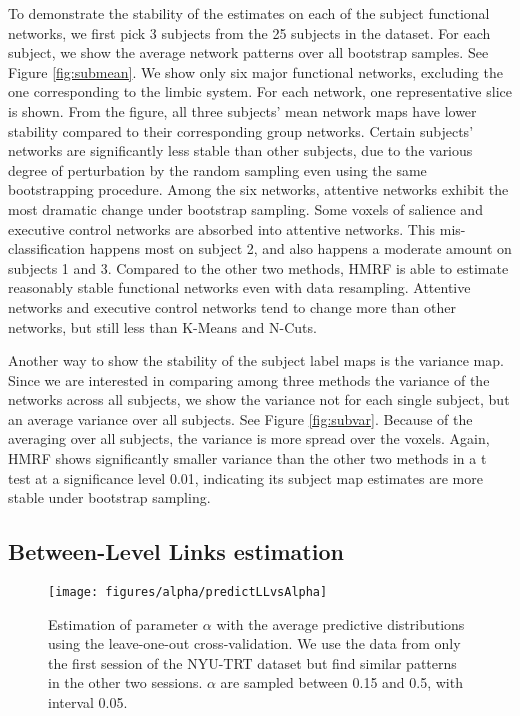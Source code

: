 \documentclass[review,authoryear]{elsarticle}
\begin{document}
To demonstrate the stability of the estimates on each of the subject functional
networks, we first pick 3 subjects from the 25 subjects in the dataset. For each
subject, we show the average network patterns over all bootstrap samples. See
Figure \ref{fig:submean}. We show only six major functional networks, excluding
the one corresponding to the limbic system. For each network, one representative
slice is shown. From the figure, all three subjects' mean network maps have
lower stability compared to their corresponding group networks. Certain
subjects' networks are significantly less stable than other subjects, due to the
various degree of perturbation by the random sampling even using the same
bootstrapping procedure. Among the six networks, attentive networks exhibit the
most dramatic change under bootstrap sampling. Some voxels of salience and
executive control networks are absorbed into attentive networks. This
mis-classification happens most on subject 2, and also happens a moderate amount
on subjects 1 and 3. Compared to the other two methods, HMRF is able to estimate
reasonably stable functional networks even with data resampling. Attentive
networks and executive control networks tend to change more than other networks,
but still less than K-Means and N-Cuts.

Another way to show the stability of the subject label maps is the variance
map. Since we are interested in comparing among three methods the variance of
the networks across all subjects, we show the variance not for each single
subject, but an average variance over all subjects. See Figure
\ref{fig:subvar}. Because of the averaging over all subjects, the variance is
more spread over the voxels. Again, HMRF shows significantly smaller variance
than the other two methods in a t test at a significance level 0.01, indicating
its subject map estimates are more stable under bootstrap sampling.

\subsection{Between-Level Links estimation}
\begin{figure}[htb]
  \centering
  \texttt{[image: figures/alpha/predictLLvsAlpha]}
  \caption{Estimation of parameter $\alpha$ with the average predictive
    distributions using the leave-one-out cross-validation. We use the data from
    only the first session of the NYU-TRT dataset but find similar patterns in
    the other two sessions. $\alpha$ are sampled between 0.15 and 0.5, with
    interval 0.05.}
  \label{fig:alphaest}
\end{figure}
\end{document}
